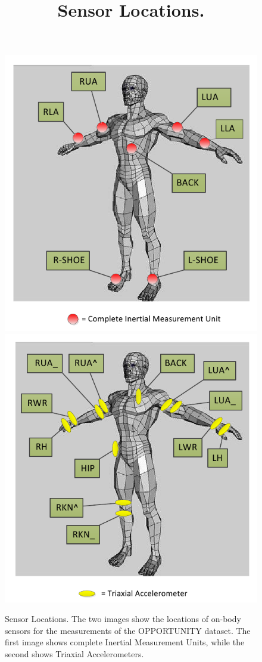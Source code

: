 \begin{figure}[ht]
	\centering
	\includegraphics[scale=.29]{figure/Fig1Cl} \hfil
	\includegraphics[scale=.29]{figure/Fig1Cr}
	\title{Sensor Locations.}
	\caption{Sensor Locations. The two images show the locations of on-body sensors for the measurements of the OPPORTUNITY dataset. The first image shows complete Inertial Measurement Units, while the second shows Triaxial Accelerometers.}
	\label{fig:sensors}
\end{figure}

